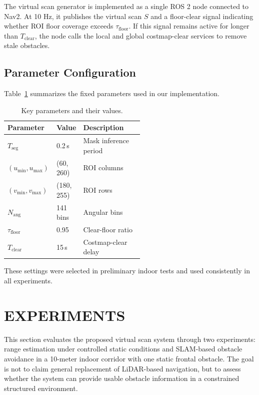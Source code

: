 \documentclass{IJCAS}
\begin{document}
The virtual scan generator is implemented as a single ROS 2 node connected to Nav2. At 10 Hz, it publishes the virtual scan $S$ and a floor-clear signal indicating whether ROI floor coverage exceeds $\tau_{\mathrm{floor}}$. If this signal remains active for longer than $T_{\mathrm{clear}}$, the node calls the local and global costmap-clear services to remove stale obstacles.

\subsection{Parameter Configuration}\label{sec:params}

Table~\ref{tab:params} summarizes the fixed parameters used in our implementation.
\begin{table}[H]
  \centering
  \caption{Key parameters and their values.}
  \label{tab:params}
  \footnotesize
  \begin{tabularx}{\linewidth}{@{}p{0.36\linewidth}p{0.18\linewidth}X@{}}
    \toprule
    Parameter & Value & Description \\
    \midrule
    $T_{\mathrm{seg}}$ & 0.2\,s & Mask inference period \\
    $(u_{\min},u_{\max})$ & (60, 260) & ROI columns \\
    $(v_{\min},v_{\max})$ & (180, 255) & ROI rows \\
    $N_{\mathrm{ang}}$ & 141 bins & Angular bins \\
    $\tau_{\mathrm{floor}}$ & 0.95 & Clear-floor ratio \\
    $T_{\mathrm{clear}}$ & 15\,s & Costmap-clear delay \\
    \bottomrule
  \end{tabularx}
\end{table}
These settings were selected in preliminary indoor tests and used consistently in all experiments.

\section{EXPERIMENTS}\label{sec4}
\label{sec:experiments}

This section evaluates the proposed virtual scan system through two experiments: range estimation under controlled static conditions and SLAM-based obstacle avoidance in a 10-meter indoor corridor with one static frontal obstacle. The goal is not to claim general replacement of LiDAR-based navigation, but to assess whether the system can provide usable obstacle information in a constrained structured environment.
\end{document}
